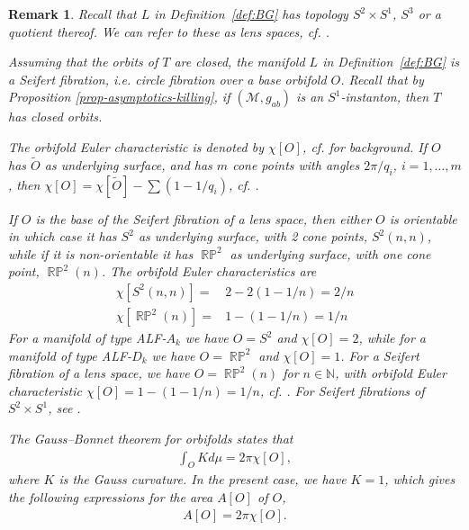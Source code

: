 \documentclass[a4paper,10pt,reqno]{amsart}
\newcommand{\cM}{\mathcal{M}}
\theoremstyle{plain}
\newtheorem{remark}[thm]{Remark}
\DeclareMathOperator{\RP}{\mathbb{R}\mathbb{P}}
\numberwithin{equation}{section}
\begin{document}
\begin{remark} \label{rem:seifert} 
Recall that $L$ in Definition~\ref{def:BG} has topology $S^2 \times S^1$, $S^3$ or a quotient thereof. We can refer to these as lens spaces, cf. \cite[\S 3]{MR3785783}.

Assuming that the orbits of $T$ are closed, the manifold $L$ in Definition~\ref{def:BG} is a Seifert fibration, i.e. circle fibration over a base orbifold $O$.  Recall that by Proposition \ref{prop-asymptotics-killing}, if $(\cM, g_{ab})$ is an $S^1$-instanton, then  $T$ has closed orbits. 

The orbifold Euler characteristic is denoted by $\chi[O]$, cf. \cite[\ S 2]{MR705527} for background. If $O$ has $\tilde O$ as underlying surface, and has $m$ cone points with angles $2\pi/q_i$, $i=1,\dots, m$, then 
$\chi[O] =\chi[\tilde O] - \sum (1-1/q_i)$, cf. \cite[p. 427]{MR705527}. 

If $O$ is the base of the Seifert fibration of a lens space, then either  $O$ is orientable in which case it has $S^2$ as underlying surface,  with 2 cone points, $S^2(n,n)$, while if it is non-orientable it has $\RP^2$ as underlying surface, with one cone point, $\RP^2(n)$. The orbifold Euler characteristics are 
\begin{align} 
\chi[S^2(n,n)] ={}& 2 - 2(1-1/n) = 2/n \\ 
\chi[\RP^2(n)] ={}& 1 - (1-1/n) = 1/n
\end{align} 
For a manifold of type ALF-$A_k$ we have $O=S^2$ and $\chi[O] = 2$, while for a manifold of type ALF-$D_k$ we have $O=\RP^2$ and $\chi[O] = 1$. For a Seifert fibration of a lens space, we have $O = \RP^2(n)$ for $n \in \mathbb{N}$, with orbifold Euler characteristic 
$\chi[O] = 1 - (1 - 1/n) = 1/n$, cf. \cite[\ S 2]{MR705527}. For Seifert fibrations of $S^2 \times S^1$, see \cite[\S 4]{MR705527}. 

The Gauss--Bonnet theorem for orbifolds \cite[\ S 2]{MR705527} states that 
\begin{align} 
\int_O K d\mu = 2\pi \chi[O], 
\end{align}
where $K$ is the Gauss curvature. 
In the present case, we have $K=1$, which gives the following expressions for the area $A[O]$ of $O$, 
\begin{align} 
A[O] = 2\pi \chi[O] .
\end{align} 

%

\end{remark} 
\end{document}
